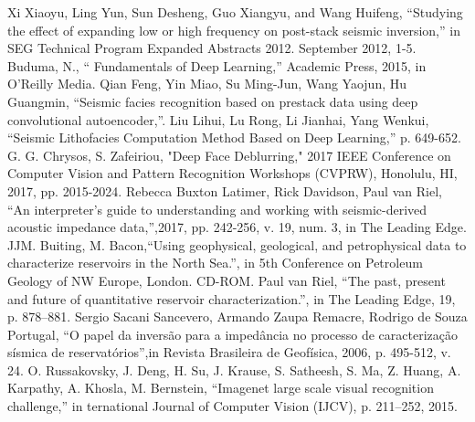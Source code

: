 \documentclass[conference,compsoc]{IEEEtran}
\begin{document}
%
%
%
\begin{thebibliography}{1}
  		Xi Xiaoyu, Ling Yun, Sun Desheng, Guo Xiangyu, and Wang Huifeng, ``Studying the effect of expanding low or high frequency on post-stack seismic inversion,'' in SEG Technical Program Expanded Abstracts 2012. September 2012, 1-5.
  		Buduma, N., `` Fundamentals of Deep Learning,'' Academic Press, 2015, in O'Reilly Media.
 			Qian Feng, Yin Miao, Su Ming-Jun, Wang Yaojun, Hu Guangmin, ``Seismic facies recognition based on prestack data using deep convolutional autoencoder,''.
 			Liu Lihui, Lu Rong, Li Jianhai, Yang Wenkui, ``Seismic Lithofacies Computation Method Based on Deep Learning,'' p. 649-652.
 		G. G. Chrysos, S. Zafeiriou, "Deep Face Deblurring," 2017 IEEE Conference on Computer Vision and Pattern Recognition Workshops (CVPRW), Honolulu, HI, 2017, pp. 2015-2024.
 		Rebecca Buxton Latimer, Rick Davidson, Paul van Riel, ``An interpreter's guide to understanding and working with seismic-derived acoustic impedance data,'',2017, pp. 242-256, v. 19, num. 3, in The Leading Edge.
 		JJM. Buiting, M. Bacon,``Using geophysical, geological, and petrophysical data to characterize reservoirs in the North Sea.'', in 5th Conference on Petroleum Geology of NW Europe, London. CD-ROM.
 			Paul van Riel,  ``The past, present and future of quantitative reservoir characterization.'', in The Leading Edge, 19, p. 878–881.
		Sergio Sacani Sancevero, Armando Zaupa Remacre, Rodrigo de Souza Portugal, ``O papel da inversão para a impedância no processo de caracterização sísmica de reservatórios'',in Revista Brasileira de Geofísica, 2006, p. 495-512, v. 24.
		O. Russakovsky, J. Deng, H. Su, J. Krause, S. Satheesh, S. Ma, Z. Huang, A. Karpathy, A. Khosla, M. Bernstein, ``Imagenet large scale visual recognition challenge,'' in ternational Journal of Computer Vision (IJCV), p. 211–252, 2015.

\end{thebibliography}
\end{document}

